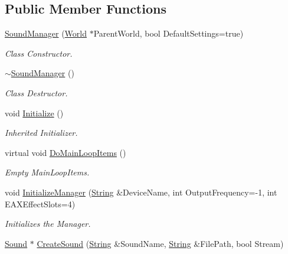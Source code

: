 \subsection*{Public Member Functions}
\begin{DoxyCompactItemize}
\item 
\hyperlink{classphys_1_1SoundManager_a134f60dd79d8049f37b076f63b5e7eaf}{SoundManager} (\hyperlink{classphys_1_1World}{World} $\ast$ParentWorld, bool DefaultSettings=true)
\begin{DoxyCompactList}\small\item\em Class Constructor. \item\end{DoxyCompactList}\item 
\hyperlink{classphys_1_1SoundManager_af557110e5f0eccc7be861f163e1670d0}{$\sim$SoundManager} ()
\begin{DoxyCompactList}\small\item\em Class Destructor. \item\end{DoxyCompactList}\item 
void \hyperlink{classphys_1_1SoundManager_ae6d3957f965b54e06ec540e903cec68d}{Initialize} ()
\begin{DoxyCompactList}\small\item\em Inherited Initializer. \item\end{DoxyCompactList}\item 
virtual void \hyperlink{classphys_1_1SoundManager_a577b228753ea19856b8476ab831e547e}{DoMainLoopItems} ()
\begin{DoxyCompactList}\small\item\em Empty MainLoopItems. \item\end{DoxyCompactList}\item 
void \hyperlink{classphys_1_1SoundManager_aa0fc07170611851f3fa888c8e28d99df}{InitializeManager} (\hyperlink{namespacephys_aa03900411993de7fbfec4789bc1d392e}{String} \&DeviceName, int OutputFrequency=-\/1, int EAXEffectSlots=4)
\begin{DoxyCompactList}\small\item\em Initializes the Manager. \item\end{DoxyCompactList}\item 
\hyperlink{classphys_1_1Sound}{Sound} $\ast$ \hyperlink{classphys_1_1SoundManager_ac9e68fef909b72110e9b68ff2674bcbb}{CreateSound} (\hyperlink{namespacephys_aa03900411993de7fbfec4789bc1d392e}{String} \&SoundName, \hyperlink{namespacephys_aa03900411993de7fbfec4789bc1d392e}{String} \&FilePath, bool Stream)

\end{DoxyCompactItemize}
